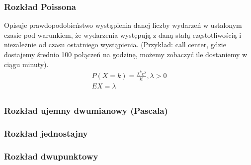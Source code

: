 \subsubsection{Rozkład Poissona}
Opisuje prawdopodobieństwo wystąpienia danej liczby wydarzeń w ustalonym czasie pod warunkiem,
że wydarzenia występują z daną stałą częstotliwością i niezależnie od czasu ostatniego wystąpienia.
(Przykład: call center, gdzie dostajemy średnio 100 połączeń na godzinę, możemy zobaczyć ile dostaniemy w ciągu minuty).
\begin{gather*}
    P(X=k)=\frac{\lambda^ke^{\lambda}}{k!}, \lambda>0\\
    EX=\lambda\\
\end{gather*}

\subsubsection{Rozkład ujemny dwumianowy (Pascala)}

\subsubsection{Rozkład jednostajny}

\subsubsection{Rozkład dwupunktowy}
